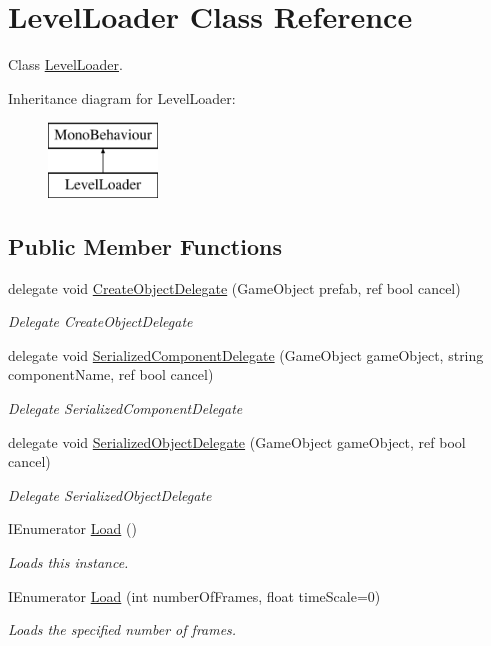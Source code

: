 \hypertarget{class_level_loader}{}\section{Level\+Loader Class Reference}
\label{class_level_loader}


Class \hyperlink{class_level_loader}{Level\+Loader}.  


Inheritance diagram for Level\+Loader\+:\begin{figure}[H]
\begin{center}
\leavevmode
\includegraphics[height=2.000000cm]{class_level_loader}
\end{center}
\end{figure}
\subsection*{Public Member Functions}
\begin{DoxyCompactItemize}
\item 
delegate void \hyperlink{class_level_loader_a251c136aac0e65fff5fef1c339fad356}{Create\+Object\+Delegate} (Game\+Object prefab, ref bool cancel)
\begin{DoxyCompactList}\small\item\em Delegate Create\+Object\+Delegate \end{DoxyCompactList}\item 
delegate void \hyperlink{class_level_loader_a233f68062303e5e0876c93646a9215ba}{Serialized\+Component\+Delegate} (Game\+Object game\+Object, string component\+Name, ref bool cancel)
\begin{DoxyCompactList}\small\item\em Delegate Serialized\+Component\+Delegate \end{DoxyCompactList}\item 
delegate void \hyperlink{class_level_loader_a4483f031503dac772decbd9beedd784a}{Serialized\+Object\+Delegate} (Game\+Object game\+Object, ref bool cancel)
\begin{DoxyCompactList}\small\item\em Delegate Serialized\+Object\+Delegate \end{DoxyCompactList}\item 
I\+Enumerator \hyperlink{class_level_loader_a9db9397a70b0263acaa645576258777b}{Load} ()
\begin{DoxyCompactList}\small\item\em Loads this instance. \end{DoxyCompactList}\item 
I\+Enumerator \hyperlink{class_level_loader_a4803ecbc9f8daab6e5a5e09bf7bf8911}{Load} (int number\+Of\+Frames, float time\+Scale=0)
\begin{DoxyCompactList}\small\item\em Loads the specified number of frames. \end{DoxyCompactList}\end{DoxyCompactItemize}
